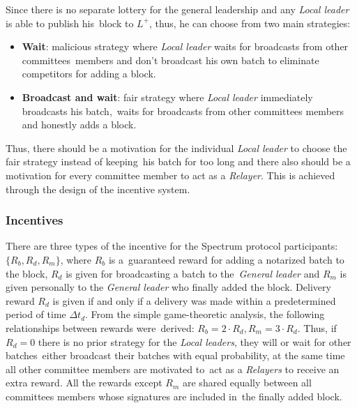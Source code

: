 Since there is no separate lottery for the general leadership and any \emph{Local leader} is able to publish his\
block to $L^+$, thus, he can choose from two main strategies:
\begin{itemize}
    \item \textbf{Wait}: malicious strategy where \emph{Local leader} waits for broadcasts from other committees\
    members and don't broadcast his own batch to eliminate competitors for adding a block.
    \item \textbf{Broadcast and wait}: fair strategy where \emph{Local leader} immediately broadcasts his batch,\
    waits for broadcasts from other committees members and honestly adds a block.
\end{itemize}
Thus, there should be a motivation for the individual \emph{Local leader} to choose the fair strategy instead of keeping\
his batch for too long and there also should be a motivation for every committee member to act as a \emph{Relayer}.
This is achieved through the design of the incentive system.

\subsubsection{Incentives}

There are three types of the incentive for the Spectrum protocol participants: ${\{R_b, R_d, R_m\}}$, where $R_b$ is a\
guaranteed reward for adding a notarized batch to the block, $R_d$ is given for broadcasting a batch to the\
\emph{General leader} and $R_m$ is given personally to the \emph{General leader} who finally added the block.
Delivery reward $R_d$ is given if and only if a delivery was made within a predetermined period of time $\Delta t_d$.
From the simple game-theoretic analysis, the following relationships between rewards were\
derived: ${R_b = 2 \cdot R_d, R_m = 3 \cdot R_d}$.
Thus, if ${R_d=0}$ there is no prior strategy for the \emph{Local leaders}, they will or wait for other batches\
either broadcast their batches with equal probability, at the same time all other committee members are motivated to\
act as a \emph{Relayers} to receive an extra reward.
All the rewards except $R_m$ are shared equally between all committees members whose signatures are included in\
the finally added block.

